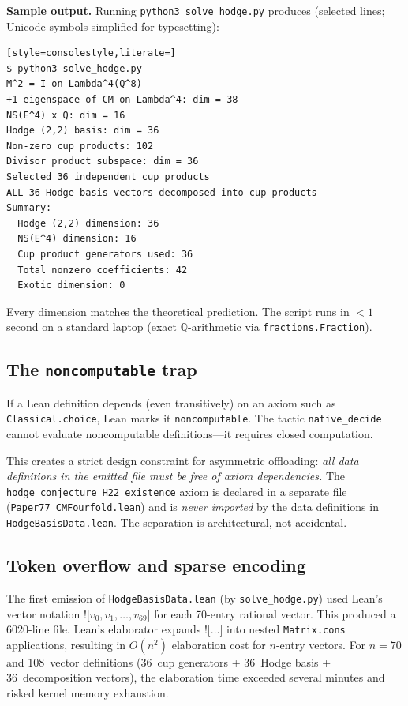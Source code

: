 \documentclass[11pt]{article}
\theoremstyle{plain}
\theoremstyle{definition}
\theoremstyle{remark}
\newcommand{\Q}{\mathbb{Q}}
\begin{document}
\medskip\noindent
\textbf{Sample output.}  Running \texttt{python3 solve\_hodge.py}
produces (selected lines; Unicode symbols simplified for typesetting):

\begin{lstlisting}[style=consolestyle,literate=]
$ python3 solve_hodge.py
M^2 = I on Lambda^4(Q^8)
+1 eigenspace of CM on Lambda^4: dim = 38
NS(E^4) x Q: dim = 16
Hodge (2,2) basis: dim = 36
Non-zero cup products: 102
Divisor product subspace: dim = 36
Selected 36 independent cup products
ALL 36 Hodge basis vectors decomposed into cup products
Summary:
  Hodge (2,2) dimension: 36
  NS(E^4) dimension: 16
  Cup product generators used: 36
  Total nonzero coefficients: 42
  Exotic dimension: 0
\end{lstlisting}

\noindent
Every dimension matches the theoretical prediction.  The script
runs in $< 1$\,second on a standard laptop (exact $\Q$-arithmetic
via \texttt{fractions.Fraction}).

\subsection{The \texttt{noncomputable} trap}

If a Lean definition depends (even transitively) on an axiom
such as \texttt{Classical.choice}, Lean marks it
\texttt{noncomputable}.  The tactic \texttt{native\_decide}
cannot evaluate noncomputable definitions---it requires closed
computation.

This creates a strict design constraint for asymmetric offloading:
\emph{all data definitions in the emitted file must be free of
axiom dependencies.}  The \texttt{hodge\_conjecture\_H22\_existence}
axiom is declared in a separate file (\texttt{Paper77\_CMFourfold.lean})
and is \emph{never imported} by the data definitions in
\texttt{HodgeBasisData.lean}.  The separation is architectural,
not accidental.

\subsection{Token overflow and sparse encoding}\label{sec:overflow}

The first emission of \texttt{HodgeBasisData.lean}
(by \texttt{solve\_hodge.py}) used Lean's vector notation
$\texttt{![}v_0, v_1, \ldots, v_{69}\texttt{]}$ for each
70-entry rational vector.  This produced a 6020-line file.
Lean's elaborator expands $\texttt{![}\ldots\texttt{]}$ into
nested \texttt{Matrix.cons} applications, resulting in
$O(n^2)$ elaboration cost for $n$-entry vectors.  For $n = 70$
and 108~vector definitions (36~cup generators + 36~Hodge basis
+ 36~decomposition vectors), the elaboration time exceeded
several minutes and risked kernel memory exhaustion.
\end{document}
